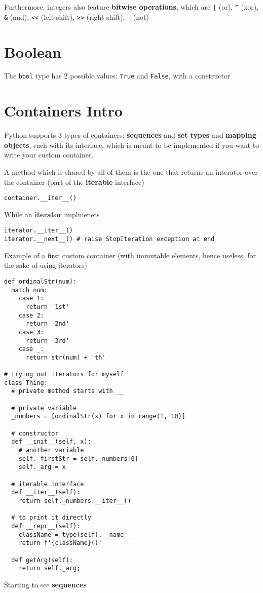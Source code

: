 \documentclass[10pt, openany]{article}
\begin{document}
  Furthermore, integers also feature \textbf{bitwise operations}, 
  which are \texttt{|} (or), \texttt{\^} (xor), 
  \texttt{\&} (and), 
  \texttt{<<} (left shift), \texttt{>>} (right shift), 
  \texttt{~} (not) \par

  \section{Boolean}
  The \texttt{bool} type has 2 possible values: \texttt{True} and 
  \texttt{False}, with a constructor

  \section{Containers Intro}
  Python supports 3 types of containers: \textbf{sequences} and 
  \textbf{set types} and \textbf{mapping objects}, each with its
  interface, which is meant to be implemented if you want to write 
  your custom container.\par
  A method which is shared by all of them is the one that returns an
  interator over the container (part of the \textbf{iterable} 
  interface)
  \begin{lstlisting}
container.__iter__()
  \end{lstlisting}
  While an \textbf{iterator} implmenets
  \begin{lstlisting}
iterator.__iter__()
iterator.__next__() # raise StopIteration exception at end
  \end{lstlisting}
  Example of a first custom container (with immutable elements, 
  hence useless, for the sake of using iterators)
  \begin{lstlisting}
def ordinalStr(num):
  match num:
    case 1:
      return '1st'
    case 2:
      return '2nd'
    case 3:
      return '3rd'
    case _:
      return str(num) + 'th'

# trying out iterators for myself
class Thing:
  # private method starts with __

  # private variable
  _numbers = [ordinalStr(x) for x in range(1, 10)]

  # constructor
  def __init__(self, x):
    # another variable
    self._firstStr = self._numbers[0]
    self._arg = x

  # iterable interface
  def __iter__(self):
    return self._numbers.__iter__()

  # to print it directly
  def __repr__(self):
    className = type(self).__name__
    return f'{className}()'

  def getArg(self):
    return self._arg;
  \end{lstlisting}
  Starting to see \textbf{sequences}
\end{document}
